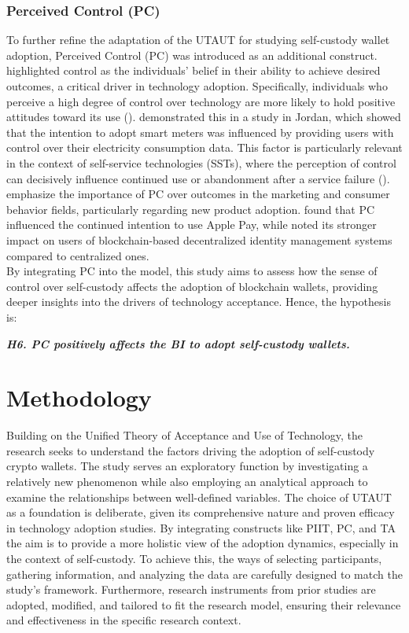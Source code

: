 \documentclass[twocolumn]{article}
\begin{document}
\subsubsection{Perceived Control (PC)}
To further refine the adaptation of the UTAUT for studying self-custody wallet adoption, Perceived Control (PC) was introduced as an additional construct. \textcite{skinner_guide_1996} highlighted control as the individuals' belief in their ability to achieve desired outcomes, a critical driver in technology adoption. Specifically, individuals who perceive a high degree of control over technology are more likely to hold positive attitudes toward its use (\cite{ajzen_perceived_2002}). \textcite{rocha_role_2018} demonstrated this in a study in Jordan, which showed that the intention to adopt smart meters was influenced by providing users with control over their electricity consumption data. This factor is particularly relevant in the context of self-service technologies (SSTs), where the perception of control can decisively influence continued use or abandonment after a service failure (\cite{le_perceived_2022}).
\\ \textcite{lin_dcap_2020} emphasize the importance of PC over outcomes in the marketing and consumer behavior fields, particularly regarding new product adoption. \textcite{liu_empirical_2017} found that PC influenced the continued intention to use Apple Pay, while \textcite{cabinakova_understanding_2019} noted its stronger impact on users of blockchain-based decentralized identity management systems compared to centralized ones.
\\By integrating PC into the model, this study aims to assess how the sense of control over self-custody affects the adoption of blockchain wallets, providing deeper insights into the drivers of technology acceptance. Hence, the hypothesis is:

\textbf{\textit{H6. PC positively affects the BI to adopt self-custody wallets.
}}

\section{Methodology}
Building on the Unified Theory of Acceptance and Use of Technology, the research seeks to understand the factors driving the adoption of self-custody crypto wallets. The study serves an exploratory function by investigating a relatively new phenomenon while also employing an analytical approach to examine the relationships between well-defined variables. The choice of UTAUT as a foundation is deliberate, given its comprehensive nature and proven efficacy in technology adoption studies. By integrating constructs like PIIT, PC, and TA the aim is to provide a more holistic view of the adoption dynamics, especially in the context of self-custody. To achieve this, the ways of selecting participants, gathering information, and analyzing the data are carefully designed to match the study's framework. Furthermore, research instruments from prior studies are adopted, modified, and tailored to fit the research model, ensuring their relevance and effectiveness in the specific research context.
\end{document}
